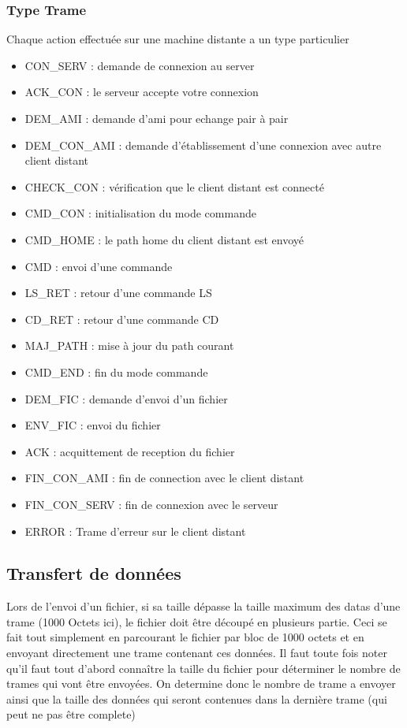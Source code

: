 \documentclass[a4paper, 11pt, french]{report}
\begin{document}
			\subsubsection{Type Trame}
				Chaque action effectuée sur une machine distante a un type particulier
				\begin{itemize}
					\item CON\_SERV : demande de connexion au server
					\item ACK\_CON : le serveur accepte votre connexion
					\item DEM\_AMI : demande d'ami pour echange pair à pair
					\item DEM\_CON\_AMI : demande d'établissement d'une connexion avec autre client distant
					\item CHECK\_CON : vérification que le client distant est connecté
					\item CMD\_CON : initialisation du mode commande 
					\item CMD\_HOME : le path home du client distant est envoyé
					\item CMD : envoi d'une commande
					\item LS\_RET : retour d'une commande LS
					\item CD\_RET : retour d'une commande CD
					\item MAJ\_PATH : mise à jour du path courant
					\item CMD\_END : fin du mode commande
					\item DEM\_FIC : demande d'envoi d'un fichier
					\item ENV\_FIC : envoi du fichier
					\item ACK : acquittement de reception du fichier
					\item FIN\_CON\_AMI : fin de connection avec le client distant
					\item FIN\_CON\_SERV : fin de connexion avec le serveur
					\item ERROR : Trame d'erreur sur le client distant
				\end{itemize}
			
			
		\subsection{Transfert de données}
			Lors de l'envoi d'un fichier, si sa taille dépasse la taille maximum des datas d'une trame (1000 Octets ici), le fichier doit être découpé en plusieurs partie. 
			Ceci se fait tout simplement en parcourant le fichier par bloc de 1000 octets et en envoyant directement une trame contenant ces données.
			Il faut toute fois noter qu'il faut tout d'abord connaître la taille du fichier pour déterminer le nombre de trames qui vont être envoyées.
			On determine donc le nombre de trame a envoyer ainsi que la taille des données qui seront contenues dans la dernière trame (qui peut ne pas être complete)
			
\end{document}
